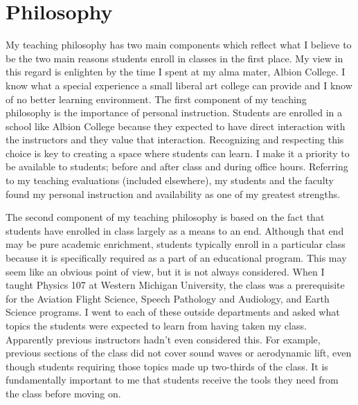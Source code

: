  {%
\def\secname{Philosophy}
\section*{\hspace{-\parindent}\secname}
\addcontentsline{toc}{section}{\secname}
My teaching philosophy has two main components which reflect what I believe to be the two main reasons students enroll in classes in the first place. %
 My view in this regard is enlighten by the time I spent at my alma mater, Albion College. I know what a special experience a small liberal art college can provide and I know of no better learning environment. 
The first component of my teaching philosophy is the importance of personal instruction.
 Students are enrolled in %
a school like Albion College because they expected to have direct interaction with the instructors and they value that interaction. Recognizing and respecting this choice is key to creating a space where students can learn.
I make it a priority to be available to students; before and after class and during office hours. Referring to my teaching evaluations (included elsewhere), my students and the faculty found my personal instruction and availability as one of my greatest strengths.

The second component of my teaching philosophy is based on the fact that students have enrolled in class largely as a means to an end. Although that end may be pure academic enrichment, students typically enroll in a particular class because it is specifically required as a part of an educational program. 
This may seem like an obvious point of view, but it is not always considered.
When I taught Physics 107 at Western Michigan University, the class was a prerequisite for the
Aviation Flight Science, 
Speech Pathology and Audiology, 
and 
Earth Science
programs. I went to each of these outside departments and asked what topics the students were expected to learn from having taken my class. Apparently previous instructors hadn't even considered this. For example, previous sections of the class did not cover sound waves or aerodynamic lift, even though students requiring those topics made up two-thirds of the class.
It is fundamentally important to me that students receive the tools they need from the class before moving on.

%
\def\secname{Goals}
}
